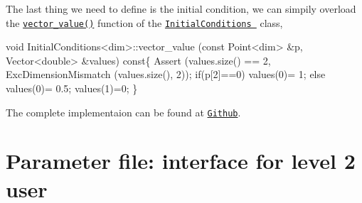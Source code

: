 The last thing we need to define is the initial condition, we can simpily overload the \href{../html/class_initial_conditions.html#aa10cfdd7350c3810a8deab707f397657}{\tt vector\-\_\-value()} function of the \href{../html/class_initial_conditions.html}{\tt Initial\-Conditions } class, 
\begin{DoxyCode}
\textcolor{keywordtype}{void} InitialConditions<dim>::vector_value (\textcolor{keyword}{const} Point<dim>   &p, Vector<double>   &values)\textcolor{keyword}{ const}\{
  Assert (values.size() == 2, ExcDimensionMismatch (values.size(), 2));
    \textcolor{keywordflow}{if}(p[2]==0) values(0)= 1;
  \textcolor{keywordflow}{else} values(0)= 0.5;
    values(1)=0;
\}
\end{DoxyCode}


The complete implementaion can be found at \href{https://github.com/mechanoChem/mechanoChemFEM/tree/example/Example4_growth}{\tt Github}. \hypertarget{growth_file}{}\section{Parameter file\-: interface for level 2 user}\label{growth_file}

